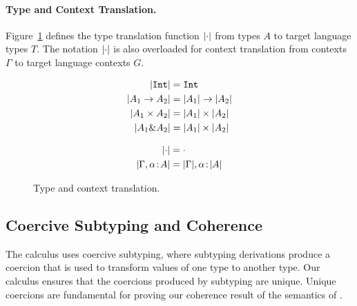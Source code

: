 \paragraph{Type and Context Translation.}

Figure~\ref{fig:type-and-context-translation} defines the type translation
function $\lvert \cdot \rvert$ from \name types $A$ to target language types $T$. The
notation $\lvert \cdot \rvert$ is also overloaded for context translation from \name
contexts $\Gamma$ to target language contexts $G$.

\begin{figure}[t]

  \begin{align*}
    \lvert \texttt{Int} \rvert         &= \texttt{Int} \\
    \lvert A_1 \to A_2 \rvert        &= \lvert A_1 \rvert \to \lvert A_2 \rvert \\
    \lvert A_1 \times A_2 \rvert &= \lvert A_1 \rvert \times \lvert A_2 \rvert \\
    \lvert A_1 \& A_2  \rvert    &= \lvert A_1 \rvert \times \lvert A_2 \rvert \\
  \end{align*}


  \begin{align*}
    \lvert \cdot \rvert                      &= \cdot \\
    \lvert \Gamma, \alpha \!:\! A \rvert &= \lvert \Gamma \rvert, \alpha \!:\! \lvert A \rvert
  \end{align*}

  \caption{Type and context translation.}
  \label{fig:type-and-context-translation}
\end{figure}



\subsection{Coercive Subtyping and Coherence} 
The \name calculus uses coercive subtyping, where subtyping
derivations produce a coercion that is used to transform values of one
type to another type. 
Our calculus ensures that the coercions produced
by subtyping are unique. Unique coercions are fundamental for proving 
our coherence result of the semantics of \name.


